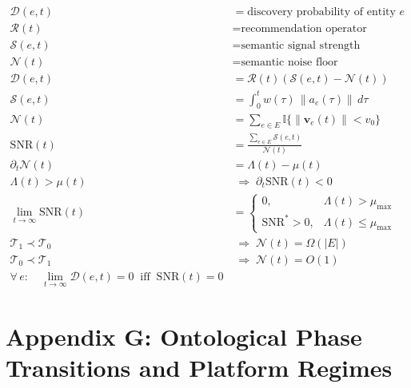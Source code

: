 \documentclass[11pt,oneside]{article}
\begin{document}
\begin{align}
\mathcal{D}(e,t) &= \text{discovery probability of entity } e \\[6pt]
\mathcal{R}(t) &= \text{recommendation operator} \\[6pt]
\mathcal{S}(e,t) &= \text{semantic signal strength} \\[6pt]
\mathcal{N}(t) &= \text{semantic noise floor} \\[10pt]

\mathcal{D}(e,t)
&= \mathcal{R}(t)\!\left(
\mathcal{S}(e,t) - \mathcal{N}(t)
\right)
\\[12pt]

\mathcal{S}(e,t)
&= \int_0^t
w(\tau)\,\|a_e(\tau)\|\,d\tau
\\[12pt]

\mathcal{N}(t)
&= \sum_{e \in E}
\mathbb{I}\{\|\mathbf{v}_e(t)\| < v_0\}
\\[12pt]

\mathrm{SNR}(t)
&=
\frac{
\sum_{e \in E}
\mathcal{S}(e,t)
}{
\mathcal{N}(t)
}
\\[12pt]

\partial_t \mathcal{N}(t)
&= \Lambda(t) - \mu(t)
\\[10pt]

\Lambda(t) > \mu(t)
&\;\Longrightarrow\;
\partial_t \mathrm{SNR}(t) < 0
\\[12pt]

\lim_{t \to \infty}
\mathrm{SNR}(t)
&=
\begin{cases}
0, & \Lambda(t) > \mu_{\max} \\[6pt]
\mathrm{SNR}^\ast > 0, & \Lambda(t) \le \mu_{\max}
\end{cases}
\\[14pt]

\mathcal{T}_1 \prec \mathcal{T}_0
&\;\Longrightarrow\;
\mathcal{N}(t) = \Omega(|E|)
\\[10pt]

\mathcal{T}_0 \prec \mathcal{T}_1
&\;\Longrightarrow\;
\mathcal{N}(t) = O(1)
\\[12pt]

\forall\, e :
\quad
\lim_{t \to \infty}
\mathcal{D}(e,t) = 0
\;\;\text{iff}\;\;
\mathrm{SNR}(t) = 0
\end{align}

\section{Appendix G: Ontological Phase Transitions and Platform Regimes}
\end{document}

